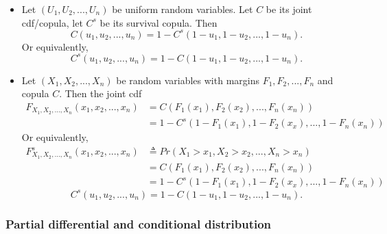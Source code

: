 \begin{refsection}
\begin{lemma}\hfill
\begin{itemize}
	\item Let $(U_1,U_2,...,U_n)$ be uniform random variables. Let $C$ be its joint cdf/copula, let $C^s$ be its survival copula. 
	Then 
	$$C(u_1,u_2,...,u_n) = 1- C^s(1-u_1,1-u_2,...,1-u_n).$$
	Or equivalently, 
	$$C^s(u_1,u_2,...,u_n) = 1- C(1-u_1,1-u_2,...,1-u_n).$$
	\item  Let $(X_1,X_2,...,X_n)$ be random variables with margins $F_1,F_2,...,F_n$ and copula $C$. Then the joint cdf
	\begin{align*}
	F_{X_1,X_2,...,X_n}(x_1,x_2,...,x_n) &=C(F_1(x_1),F_2(x_2),...,F_n(x_n))\\
						&= 1- C^s(1-F_1(x_1),1-F_2(x_x),...,1-F_n(x_n)) 
	\end{align*}
	Or equivalently, 
		\begin{align*}
	F^s_{X_1,X_2,...,X_n}(x_1,x_2,...,x_n) &\triangleq Pr(X_1>x_1,X_2>x_2,...,X_n>x_n) \\ &=C(F_1(x_1),F_2(x_2),...,F_n(x_n))\\
	&= 1- C^s(1-F_1(x_1),1-F_2(x_x),...,1-F_n(x_n)) 
	\end{align*}
	$$C^s(u_1,u_2,...,u_n) = 1- C(1-u_1,1-u_2,...,1-u_n).$$
	 
\end{itemize}	

\end{lemma}


\subsubsection{Partial differential and conditional distribution}


\end{refsection}
